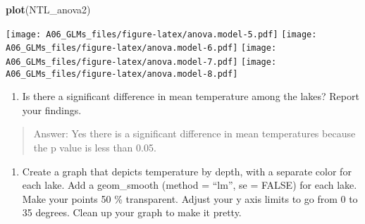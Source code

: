 \documentclass[
]{article}
\newenvironment{Shaded}{\begin{snugshade}}{\end{snugshade}}
\newcommand{\CommentTok}[1]{\textcolor[rgb]{0.56,0.35,0.01}{\textit{#1}}}
\newcommand{\DataTypeTok}[1]{\textcolor[rgb]{0.13,0.29,0.53}{#1}}
\newcommand{\DecValTok}[1]{\textcolor[rgb]{0.00,0.00,0.81}{#1}}
\newcommand{\FloatTok}[1]{\textcolor[rgb]{0.00,0.00,0.81}{#1}}
\newcommand{\KeywordTok}[1]{\textcolor[rgb]{0.13,0.29,0.53}{\textbf{#1}}}
\newcommand{\NormalTok}[1]{#1}
\newcommand{\OperatorTok}[1]{\textcolor[rgb]{0.81,0.36,0.00}{\textbf{#1}}}
\newcommand{\OtherTok}[1]{\textcolor[rgb]{0.56,0.35,0.01}{#1}}
\newcommand{\StringTok}[1]{\textcolor[rgb]{0.31,0.60,0.02}{#1}}
\providecommand{\tightlist}{%
  \setlength{\itemsep}{0pt}\setlength{\parskip}{0pt}}
\begin{document}
\begin{Shaded}
\begin{Highlighting}[]
\KeywordTok{plot}\NormalTok{(NTL_anova2)}
\end{Highlighting}
\end{Shaded}

\texttt{[image: A06\_GLMs\_files/figure-latex/anova.model-5.pdf]}
\texttt{[image: A06\_GLMs\_files/figure-latex/anova.model-6.pdf]}
\texttt{[image: A06\_GLMs\_files/figure-latex/anova.model-7.pdf]}
\texttt{[image: A06\_GLMs\_files/figure-latex/anova.model-8.pdf]}

\begin{enumerate}
\def\labelenumi{\arabic{enumi}.}
\setcounter{enumi}{12}
\tightlist
\item
  Is there a significant difference in mean temperature among the lakes?
  Report your findings.
\end{enumerate}

\begin{quote}
Answer: Yes there is a significant difference in mean temperatures
because the p value is less than 0.05.
\end{quote}

\begin{enumerate}
\def\labelenumi{\arabic{enumi}.}
\setcounter{enumi}{13}
\tightlist
\item
  Create a graph that depicts temperature by depth, with a separate
  color for each lake. Add a geom\_smooth (method = ``lm'', se = FALSE)
  for each lake. Make your points 50 \% transparent. Adjust your y axis
  limits to go from 0 to 35 degrees. Clean up your graph to make it
  pretty.
\end{enumerate}

\begin{Shaded}
\end{Shaded}
\end{document}
